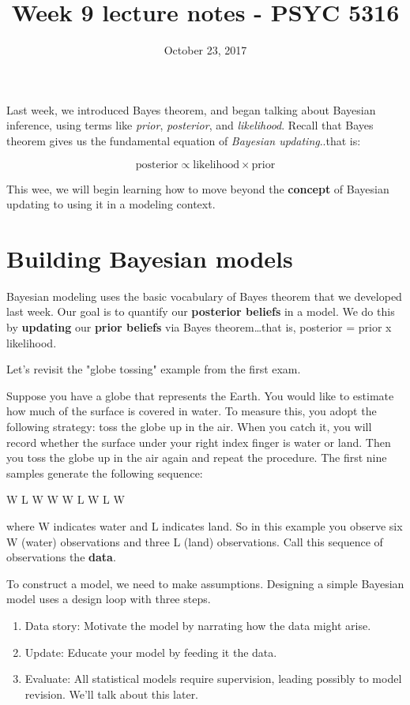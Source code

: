 \documentclass[11pt]{article}
\date{October 23, 2017}
\title{Week 9 lecture notes - PSYC 5316}
\begin{document}
\maketitle
Last week, we introduced Bayes theorem, and began talking about Bayesian inference, using terms like \emph{prior}, \emph{posterior}, and \emph{likelihood}.  Recall that Bayes theorem gives us the fundamental equation of \emph{Bayesian updating}..that is:

\[
\text{posterior} \propto \text{likelihood} \times \text{prior}
\]

This wee, we will begin learning how to move beyond the \textbf{concept} of Bayesian updating to using it in a modeling context. 

\section*{Building Bayesian models}
\label{sec-1}
Bayesian modeling uses the basic vocabulary of Bayes theorem that we developed last week.  Our goal is to quantify our \textbf{posterior beliefs} in a model.  We do this by \textbf{updating} our \textbf{prior beliefs} via Bayes theorem\ldots{}that is, posterior = prior x likelihood.

Let's revisit the "globe tossing" example from the first exam.

Suppose you have a globe that represents the Earth.  You would like to estimate how much of the surface is covered in water.  To measure this, you adopt the following strategy: toss the globe up in the air. When you catch it, you will record whether the surface under your right index finger is water or land.  Then you toss the globe up in the air again and repeat the procedure. The first nine samples generate the following sequence:

W L W W W L W L W

where W indicates water and L indicates land. So in this example you observe six W (water) observations and three L (land) observations. Call this sequence of observations the \textbf{data}.

To construct a model, we need to make assumptions.  Designing a simple Bayesian model uses a design loop with three steps.

\begin{enumerate}
\item Data story: Motivate the model by narrating how the data might arise.
\item Update: Educate your model by feeding it the data.
\item Evaluate: All statistical models require supervision, leading possibly to model revision.  We'll talk about this later.
\end{enumerate}
\end{document}
